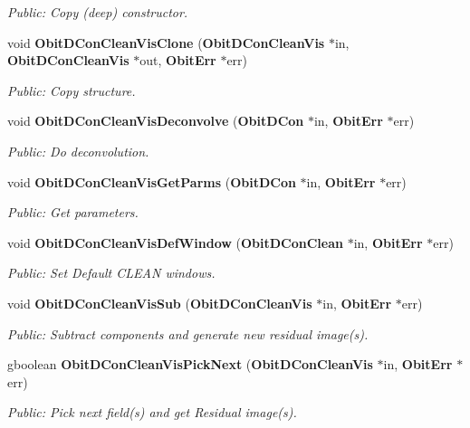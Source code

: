 \begin{CompactItemize}
\begin{CompactList}\small\item\em Public: Copy (deep) constructor. \item\end{CompactList}\item 
void {\bf Obit\-DCon\-Clean\-Vis\-Clone} ({\bf Obit\-DCon\-Clean\-Vis} $\ast$in, {\bf Obit\-DCon\-Clean\-Vis} $\ast$out, {\bf Obit\-Err} $\ast$err)
\begin{CompactList}\small\item\em Public: Copy structure. \item\end{CompactList}\item 
void {\bf Obit\-DCon\-Clean\-Vis\-Deconvolve} ({\bf Obit\-DCon} $\ast$in, {\bf Obit\-Err} $\ast$err)
\begin{CompactList}\small\item\em Public: Do deconvolution. \item\end{CompactList}\item 
void {\bf Obit\-DCon\-Clean\-Vis\-Get\-Parms} ({\bf Obit\-DCon} $\ast$in, {\bf Obit\-Err} $\ast$err)
\begin{CompactList}\small\item\em Public: Get parameters. \item\end{CompactList}\item 
void {\bf Obit\-DCon\-Clean\-Vis\-Def\-Window} ({\bf Obit\-DCon\-Clean} $\ast$in, {\bf Obit\-Err} $\ast$err)
\begin{CompactList}\small\item\em Public: Set Default CLEAN windows. \item\end{CompactList}\item 
void {\bf Obit\-DCon\-Clean\-Vis\-Sub} ({\bf Obit\-DCon\-Clean\-Vis} $\ast$in, {\bf Obit\-Err} $\ast$err)
\begin{CompactList}\small\item\em Public: Subtract components and generate new residual image(s). \item\end{CompactList}\item 
gboolean {\bf Obit\-DCon\-Clean\-Vis\-Pick\-Next} ({\bf Obit\-DCon\-Clean\-Vis} $\ast$in, {\bf Obit\-Err} $\ast$err)
\begin{CompactList}\small\item\em Public: Pick next field(s) and get Residual image(s). \item\end{CompactList}\item 

\end{CompactItemize}
